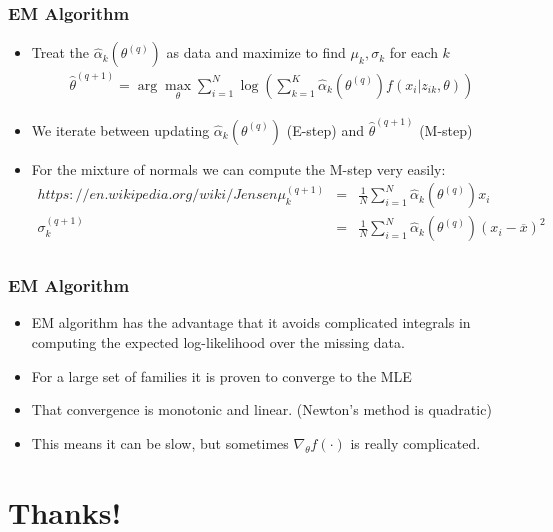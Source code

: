 \documentclass[aspectratio=169]{beamer}
\begin{document}
\begin{frame}
\frametitle{EM Algorithm}
\begin{itemize}
\item Treat the $\hat{\alpha}_k(\theta^{(q)})$ as data and maximize to find $\mu_k,\sigma_k$ for each $k$
\begin{eqnarray*}
\hat{\theta}^{(q+1)} = \arg \max_{\theta}  \sum_{i=1}^N  \log \left( \sum_{k=1}^K \hat{\alpha}_k(\theta^{(q)}) f(x_i | z_{ik}, \theta ) \right)
\end{eqnarray*}
\item We iterate between updating $\hat{\alpha}_k(\theta^{(q)})$ (E-step) and $\hat{\theta}^{(q+1)}$ (M-step)
\item For the mixture of normals we can compute the M-step very easily:
\begin{eqnarray*}https://en.wikipedia.org/wiki/Jensen%
\mu_k^{(q+1)} &=& \frac{1}{N} \sum_{i=1}^N \hat{\alpha}_k(\theta^{(q)}) x_{i}\\
\sigma_k^{(q+1)} &=& \frac{1}{N} \sum_{i=1}^N \hat{\alpha}_k(\theta^{(q)}) (x_{i} - \overline{x})^2 \\
\end{eqnarray*}
\end{itemize}
\end{frame}

\begin{frame}
\frametitle{EM Algorithm}
\begin{itemize}
\item EM algorithm has the advantage that it avoids complicated integrals in computing the expected log-likelihood over the missing data.
\item For a large set of families it is proven to converge to the MLE
\item That convergence is \alert{monotonic} and \alert{linear}. (Newton's method is quadratic)
\item This means it can be slow, but sometimes $\nabla_{\theta} f (\cdot)$ is really complicated.
\end{itemize}
\end{frame}

\section*{Thanks!}
\end{document}
